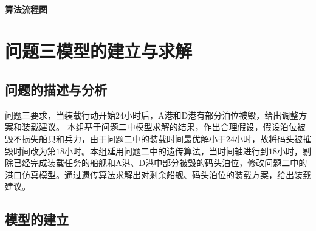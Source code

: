 \documentclass{whutmod}
\begin{document}
     \paragraph{算法流程图}
     
     
     \section{问题三模型的建立与求解}
   	\subsection{问题的描述与分析}
   	问题三要求，当装载行动开始24小时后，A港和D港有部分泊位被毁，给出调整方案和装载建议。
   	本组基于问题二中模型求解的结果，作出合理假设，假设泊位被毁不损失船只和兵力，由于问题二中的装载时间最优解小于$24$小时，故将码头被摧毁时间改为第$18$小时。本组延用问题二中的遗传算法，当时间轴进行到$18$小时，剔除已经完成装载任务的船舰和A港、D港中部分被毁的码头泊位，修改问题二中的港口仿真模型。通过遗传算法求解出对剩余船舰、码头泊位的装载方案，给出装载建议。
  \subsection{模型的建立}
\end{document}
